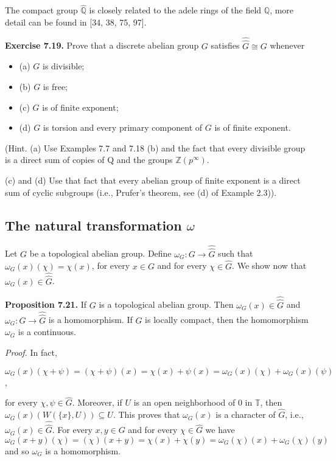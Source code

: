 \documentclass[12pt]{article}
\begin{document}
    The compact group $\hat{\mathbb{Q}}$ is closely related to the adele rings of the field $\mathbb{Q}$, more detail can be found in
[34, 38, 75, 97].
    

\textbf{Exercise 7.19.} Prove that a discrete abelian group $G$ satisfies $\hat{\hat{G}} \cong G$ whenever

\begin{itemize}

    \item (a) $G$ is divisible;

    \item (b) $G$ is free;

    \item (c) $G$ is of finite exponent;

    \item (d) $G$ is torsion and every primary component of $G$ is of finite exponent.

\end{itemize}

    (Hint. (a) Use Examples 7.7 and 7.18 (b) and the fact that every divisible group is a direct sum of copies of
Q and the groups $\mathbb{Z}(p^{\infty})$.


    (c) and (d) Use that fact that every abelian group of finite exponent is a direct sum of cyclic subgroups (i.e.,
Prufer's theorem, see (d) of Example 2.3)).


\subsection{The natural transformation $\omega$}


Let $G$ be a topological abelian group. Define $\omega_G : G \to \hat{\hat{G}}$ such that $\omega_G(x)(\chi) = \chi(x)$, for every $x \in G$ and for
every $\chi \in \hat{G}$. We show now that $\omega_G (x) \in \hat{\hat{G}}$.


\textbf{Proposition 7.21.} If $G$ is a topological abelian group. Then $\omega_G (x) \in \hat{\hat{G}}$ and $\omega_G : G \to \hat{\hat{G}}$ is a homomorphism.
If $G$ is locally compact, then the homomorphism $\omega_G$ is a continuous.


\emph{Proof.} In fact, 

    
    $\omega_G(x)(\chi + \psi) = (\chi + \psi)(x) = \chi (x) + \psi (x) = \omega_G(x)(\chi) + \omega_G(x)(\psi)$,


for every $\chi, \psi \in \hat{G}$. Moreover, if $U$ is an open neighborhood of 0 in $\mathbb{T}$, then $\omega_G(x)(W(\{x\}, U)) \subseteq U$. This
proves that $\omega_G(x)$ is a character of $\hat{G}$, i.e., $\omega_G(x) \in \hat{\hat{G}}$. For every $x, y \in G$ and for every $\chi \in \hat{G}$ we have
$\omega_G(x + y)(\chi) = (\chi)(x + y) = \chi(x) + \chi(y) = \omega_G(\chi)(x) + \omega_G(\chi)(y)$ and so $\omega_G$ is a homomorphism.
\end{document}
